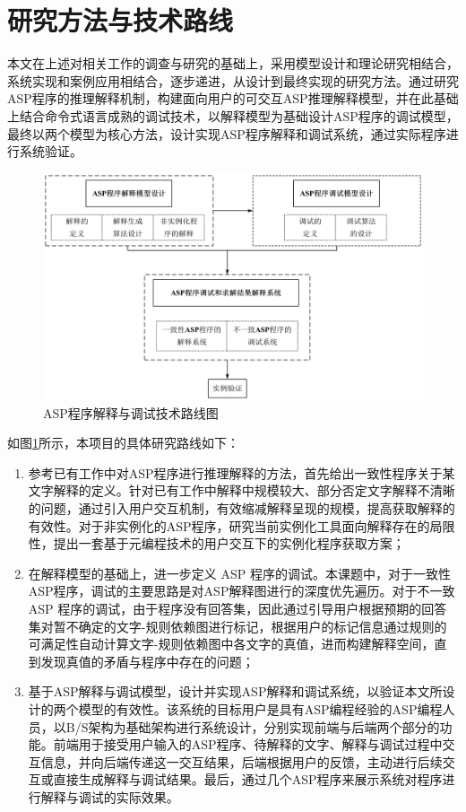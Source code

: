 \section{研究方法与技术路线}
本文在上述对相关工作的调查与研究的基础上，采用模型设计和理论研究相结合，系统实现和案例应用相结合，逐步递进，从设计到最终实现的研究方法。通过研究ASP程序的推理解释机制，构建面向用户的可交互ASP推理解释模型，并在此基础上结合命令式语言成熟的调试技术，以解释模型为基础设计ASP程序的调试模型，最终以两个模型为核心方法，设计实现ASP程序解释和调试系统，通过实际程序进行系统验证。
\begin{figure}[!ht] 
    \centering 
    \includegraphics[width=\linewidth]{figures/研究内容关联图.jpg}
    \caption{ASP程序解释与调试技术路线图} 
    \label{fig:1_1} 
\end{figure}
如图\ref{fig:1_1}所示，本项目的具体研究路线如下：
\begin{enumerate}[label=(\arabic*),topsep=0pt]
    \setlength\itemsep{-0.3em}
    \item 参考已有工作中对ASP程序进行推理解释的方法，首先给出一致性程序关于某文字解释的定义。针对已有工作中解释中规模较大、部分否定文字解释不清晰的问题，通过引入用户交互机制，有效缩减解释呈现的规模，提高获取解释的有效性。对于非实例化的ASP程序，研究当前实例化工具面向解释存在的局限性，提出一套基于元编程技术的用户交互下的实例化程序获取方案；
    \item 在解释模型的基础上，进一步定义 ASP 程序的调试。本课题中，对于一致性ASP程序，调试的主要思路是对ASP解释图进行的深度优先遍历。对于不一致 ASP 程序的调试，由于程序没有回答集，因此通过引导用户根据预期的回答集对暂不确定的文字-规则依赖图进行标记，根据用户的标记信息通过规则的可满足性自动计算文字-规则依赖图中各文字的真值，进而构建解释空间，直到发现真值的矛盾与程序中存在的问题；
    \item 基于ASP解释与调试模型，设计并实现ASP解释和调试系统，以验证本文所设计的两个模型的有效性。该系统的目标用户是具有ASP编程经验的ASP编程人员，以B/S架构为基础架构进行系统设计，分别实现前端与后端两个部分的功能。前端用于接受用户输入的ASP程序、待解释的文字、解释与调试过程中交互信息，并向后端传递这一交互结果，后端根据用户的反馈，主动进行后续交互或直接生成解释与调试结果。最后，通过几个ASP程序来展示系统对程序进行解释与调试的实际效果。
\end{enumerate}
